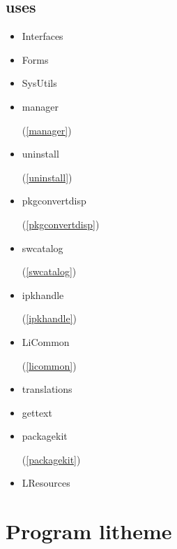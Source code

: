 \documentclass{report}
\begin{document}
\section{uses}
\begin{itemize}
\item \begin{ttfamily}Interfaces\end{ttfamily}\item \begin{ttfamily}Forms\end{ttfamily}\item \begin{ttfamily}SysUtils\end{ttfamily}\item \begin{ttfamily}manager\end{ttfamily}(\ref{manager})\item \begin{ttfamily}uninstall\end{ttfamily}(\ref{uninstall})\item \begin{ttfamily}pkgconvertdisp\end{ttfamily}(\ref{pkgconvertdisp})\item \begin{ttfamily}swcatalog\end{ttfamily}(\ref{swcatalog})\item \begin{ttfamily}ipkhandle\end{ttfamily}(\ref{ipkhandle})\item \begin{ttfamily}LiCommon\end{ttfamily}(\ref{licommon})\item \begin{ttfamily}translations\end{ttfamily}\item \begin{ttfamily}gettext\end{ttfamily}\item \begin{ttfamily}packagekit\end{ttfamily}(\ref{packagekit})\item \begin{ttfamily}LResources\end{ttfamily}\end{itemize}
\chapter{Program litheme}
\label{litheme}
\end{document}
